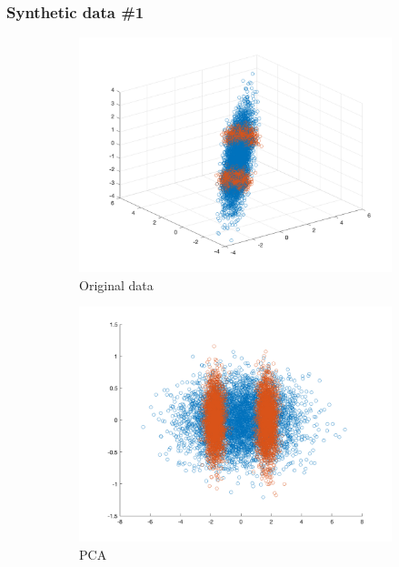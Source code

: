 \documentclass{beamer}
\begin{document}
\begin{frame}
	\frametitle{Synthetic data \#1}
	\begin{figure}[!t]
		\begin{center}
			\begin{subfigure}[t]{0.24\linewidth}
				\includegraphics[width=\linewidth]{figures/exp1-1/original.png}
				\caption{\label{fig:original} Original data}
			\end{subfigure}\hfill
			\begin{subfigure}[t]{0.24\linewidth}
				\includegraphics[width=\linewidth]{figures/exp1-1/pca.png}
				\caption{\label{fig:PCA} PCA}
			\end{subfigure}\hfill
			\begin{subfigure}[t]{0.24\linewidth}

\end{subfigure}
\end{center}
\end{figure}
\end{frame}
\end{document}
